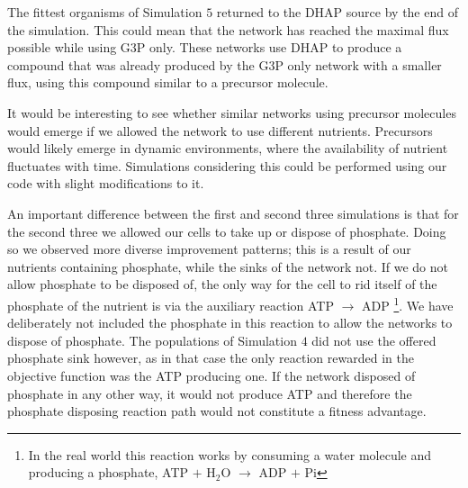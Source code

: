 \documentclass[a4paper,12pt]{article}
\begin{document}
The fittest organisms of Simulation $5$ returned to the DHAP source by the end of the simulation. This could mean that the network has reached the maximal flux possible while using G3P only. These networks use DHAP to produce a compound that was already produced by the G3P only network with a smaller flux, using this compound similar to a precursor molecule. 

It would be interesting to see whether similar networks using precursor molecules would emerge if we allowed the network to use different nutrients. Precursors would likely emerge in dynamic environments, where the availability of nutrient fluctuates with time. Simulations considering this could be performed using our code with slight modifications to it. 

An important difference between the first and second three simulations is that for the second three we allowed our cells to take up or dispose of phosphate. Doing so we observed more diverse improvement patterns; this is a result of our nutrients containing phosphate, while the sinks of the network not. If we do not allow phosphate to be disposed of, the only way for the cell to rid itself of the phosphate of the nutrient is via the auxiliary reaction ATP $\rightarrow$ ADP \footnote{In the real world this reaction works by consuming a water molecule and producing a phosphate, ATP $+$ H$_2$O $\rightarrow$ ADP $+$ Pi}. We have deliberately not included the phosphate in this reaction to allow the networks to dispose of phosphate. The populations of Simulation $4$ did not use the offered phosphate sink however, as in that case the only reaction rewarded in the objective function was the ATP producing one. If the network disposed of phosphate in any other way, it would not produce ATP and therefore the phosphate disposing reaction path would not constitute a fitness advantage.

\end{document}
